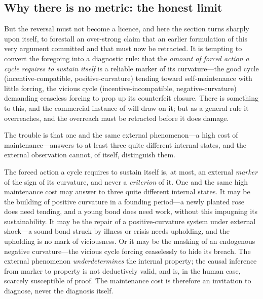 \subsection{Why there is no metric: the honest limit}
\label{p09:sec:no-metric}

But the reversal must not become a licence, and here the section turns sharply upon itself, to forestall an over-strong claim that an earlier formulation of this very argument committed and that must now be retracted. It is tempting to convert the foregoing into a diagnostic rule: that the \emph{amount of forced action a cycle requires to sustain itself} is a reliable marker of its curvature---the good cycle (incentive-compatible, positive-curvature) tending toward self-maintenance with little forcing, the vicious cycle (incentive-incompatible, negative-curvature) demanding ceaseless forcing to prop up its counterfeit closure. There is something to this, and the commercial instance of  will draw on it; but as a general rule it overreaches, and the overreach must be retracted before it does damage.

The trouble is that one and the same external phenomenon---a high cost of maintenance---answers to at least three quite different internal states, and the external observation cannot, of itself, distinguish them.

\begin{claim}
The forced action a cycle requires to sustain itself is, at most, an external \emph{marker} of the sign of its curvature, and never a \emph{criterion} of it. One and the same high maintenance cost may answer to three quite different internal states. It may be the building of positive curvature in a founding period---a newly planted rose does need tending, and a young bond does need work, without this impugning its sustainability. It may be the repair of a positive-curvature system under external shock---a sound bond struck by illness or crisis needs upholding, and the upholding is no mark of viciousness. Or it may be the masking of an endogenous negative curvature---the vicious cycle forcing ceaselessly to hide its breach. The external phenomenon \emph{underdetermines} the internal property; the causal inference from marker to property is not deductively valid, and is, in the human case, scarcely susceptible of proof. The maintenance cost is therefore an invitation to diagnose, never the diagnosis itself.
\end{claim}

